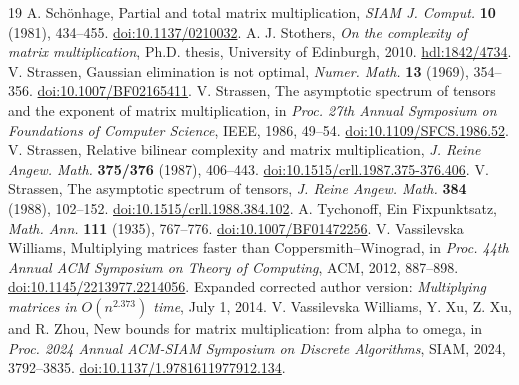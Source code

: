 \begin{thebibliography}{19}
 A. Sch\"onhage, Partial and total matrix multiplication, \emph{SIAM J. Comput.} \textbf{10} (1981), 434--455. \href{https://doi.org/10.1137/0210032}{doi:10.1137/0210032}.
 A. J. Stothers, \emph{On the complexity of matrix multiplication}, Ph.D. thesis, University of Edinburgh, 2010. \href{https://hdl.handle.net/1842/4734}{hdl:1842/4734}.
 V. Strassen, Gaussian elimination is not optimal, \emph{Numer. Math.} \textbf{13} (1969), 354--356. \href{https://doi.org/10.1007/BF02165411}{doi:10.1007/BF02165411}.
 V. Strassen, The asymptotic spectrum of tensors and the exponent of matrix multiplication, in \emph{Proc. 27th Annual Symposium on Foundations of Computer Science}, IEEE, 1986, 49--54. \href{https://doi.org/10.1109/SFCS.1986.52}{doi:10.1109/SFCS.1986.52}.
 V. Strassen, Relative bilinear complexity and matrix multiplication, \emph{J. Reine Angew. Math.} \textbf{375/376} (1987), 406--443. \href{https://doi.org/10.1515/crll.1987.375-376.406}{doi:10.1515/crll.1987.375-376.406}.
 V. Strassen, The asymptotic spectrum of tensors, \emph{J. Reine Angew. Math.} \textbf{384} (1988), 102--152. \href{https://doi.org/10.1515/crll.1988.384.102}{doi:10.1515/crll.1988.384.102}.
 A. Tychonoff, Ein Fixpunktsatz, \emph{Math. Ann.} \textbf{111} (1935), 767--776. \href{https://doi.org/10.1007/BF01472256}{doi:10.1007/BF01472256}.
 V. Vassilevska Williams, Multiplying matrices faster than Coppersmith--Winograd, in \emph{Proc. 44th Annual ACM Symposium on Theory of Computing}, ACM, 2012, 887--898. \href{https://doi.org/10.1145/2213977.2214056}{doi:10.1145/2213977.2214056}. Expanded corrected author version: \emph{Multiplying matrices in $O(n^{2.373})$ time}, July 1, 2014.
 V. Vassilevska Williams, Y. Xu, Z. Xu, and R. Zhou, New bounds for matrix multiplication: from alpha to omega, in \emph{Proc. 2024 Annual ACM-SIAM Symposium on Discrete Algorithms}, SIAM, 2024, 3792--3835. \href{https://doi.org/10.1137/1.9781611977912.134}{doi:10.1137/1.9781611977912.134}.
\end{thebibliography}
